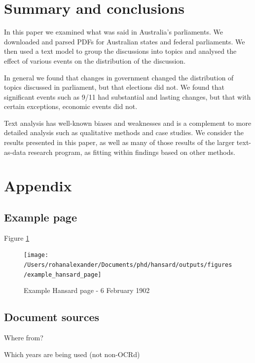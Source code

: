 \documentclass[12pt,]{article}
\theoremstyle{definition}
\theoremstyle{definition}
\theoremstyle{definition}
\theoremstyle{remark}
\begin{document}
\section{Summary and conclusions}\label{summary-and-conclusions}

In this paper we examined what was said in Australia's parliaments. We
downloaded and parsed PDFs for Australian states and federal
parliaments. We then used a text model to group the discussions into
topics and analysed the effect of various events on the distribution of
the discussion.

In general we found that changes in government changed the distribution
of topics discussed in parliament, but that elections did not. We found
that significant events such as 9/11 had substantial and lasting
changes, but that with certain exceptions, economic events did not.

Text analysis has well-known biases and weaknesses and is a complement
to more detailed analysis such as qualitative methods and case studies.
We consider the results presented in this paper, as well as many of
those results of the larger text-as-data research program, as fitting
within findings based on other methods.

\newpage

\appendix


\section{Appendix}\label{appendix}

\subsection{Example page}\label{example-page}

Figure \ref{fig:asdf}

\begin{figure}
\texttt{[image: /Users/rohanalexander/Documents/phd/hansard/outputs/figures/example\_hansard\_page]} \caption{Example Hansard page - 6 February 1902}\label{fig:asdf}
\end{figure}

\subsection{Document sources}\label{document-sources}

Where from?

Which years are being used (not non-OCRd)
\end{document}
